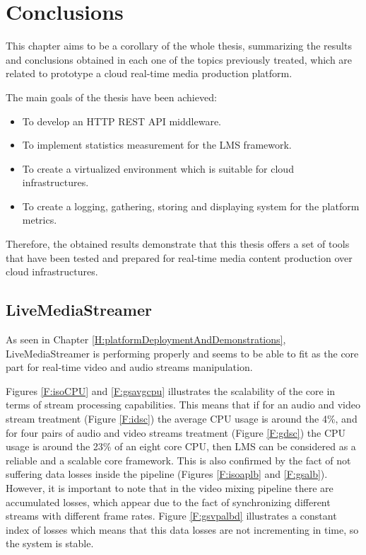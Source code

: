 \chapter{Conclusions}\label{C:conclusions}

This chapter aims to be a corollary of the whole thesis, summarizing the results and conclusions obtained in each one of the topics previously treated, which are related to prototype a cloud real-time media production platform.

The main goals of the thesis have been achieved:

\begin{itemize}
\item To develop an HTTP REST API middleware.
\item To implement statistics measurement for the LMS framework.
\item To create a virtualized environment which is suitable for cloud infrastructures.
\item To create a logging, gathering, storing and displaying system for the platform metrics.
\end{itemize}

Therefore, the obtained results demonstrate that this thesis offers a set of tools that have been tested and prepared for real-time media content production over cloud infrastructures.

\section{LiveMediaStreamer}

As seen in Chapter \ref{H:platformDeploymentAndDemonstrations}, LiveMediaStreamer is performing properly and seems to be able to fit as the core part for real-time video and audio streams manipulation.

Figures \ref{F:isoCPU} and \ref{F:gsavgcpu} illustrates the scalability of the core in terms of stream processing capabilities. This means that if for an audio and video stream treatment (Figure \ref{F:idsc}) the average CPU usage is around the 4\%, and for four pairs of audio and video streams treatment (Figure \ref{F:gdsc}) the CPU usage is around the 23\% of an eight core CPU, then LMS can be considered as a reliable and a scalable core framework. This is also confirmed by the fact of not suffering data losses inside the pipeline (Figures \ref{F:isoaplb} and \ref{F:gsalb}). However, it is important to note that in the video mixing pipeline there are accumulated losses, which appear due to the fact of synchronizing different streams with different frame rates. Figure \ref{F:gsvpalbd} illustrates a constant index of losses which means that this data losses are not incrementing in time, so the system is stable.

